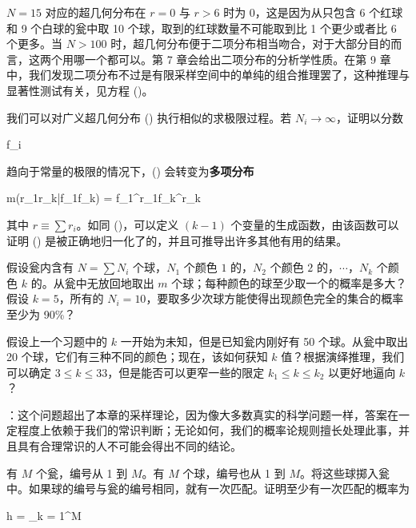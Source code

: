
\indentation $N = 15$ 对应的超几何分布在 $r = 0$ 与 $r > 6$ 时为 $0$，这是因为从只包含 6 个红球和 9 个白球的瓮中取 10 个球，取到的红球数量不可能取到比 1 个更少或者比 6 个更多。当 $N > 100$ 时，超几何分布便于二项分布相当吻合，对于大部分目的而言，这两个用哪一个都可以。第 7 章会给出二项分布的分析学性质。在第 9 章中，我们发现二项分布不过是有限采样空间中的单纯的组合推理罢了，这种推理与显著性测试有关，见方程 (\in[9-46])。

我们可以对广义超几何分布 (\in[3-75]) 执行相似的求极限过程。若 $N_i\rightarrow\infty$，证明以分数

\placeformula[3-88]
\startformula
f_i \equiv {}
\stopformula

趋向于常量的极限的情况下，(\in[3-75]) 会转变为{\bf 多项分布}

\placeformula[3-89]
\startformula
m(r_1\cdots r_k|f_1\cdots f_k) = f_1^{r_1}\cdots f_k^{r_k}
\stopformula

其中 $r \equiv \sum r_i$。如同 (\in[3-87])，可以定义 $(k - 1)$ 个变量的生成函数，由该函数可以证明 (\in[3-89]) 是被正确地归一化了的，并且可推导出许多其他有用的结果。

\startExercise
假设瓮内含有 $N = \sum N_i$ 个球，$N_1$ 个颜色 $1$ 的，$N_2$ 个颜色 $2$ 的，$\cdots$，$N_k$ 个颜色 $k$ 的。从瓮中无放回地取出 $m$ 个球；每种颜色的球至少取一个的概率是多大？假设 $k = 5$，所有的 $N_i = 10$，要取多少次球方能使得出现颜色完全的集合的概率至少为 90\%？
\stopExercise

\startExercise
假设上一个习题中的 $k$ 一开始为未知，但是已知瓮内刚好有 50 个球。从瓮中取出 20 个球，它们有三种不同的颜色；现在，该如何获知 $k$ 值？根据演绎推理，我们可以确定 $3 \le k \le 33$，但是能否可以更窄一些的限定 $k_1\le k \le k_2$ 以更好地逼向 $k$？

：这个问题超出了本章的采样理论，因为像大多数真实的科学问题一样，答案在一定程度上依赖于我们的常识判断；无论如何，我们的概率论规则擅长处理此事，并且具有合理常识的人不可能会得出不同的结论。
\stopExercise

\startExercise
有 $M$ 个瓮，编号从 1 到 $M$。有 $M$ 个球，编号也从 1 到 $M$。将这些球掷入瓮中。如果球的编号与瓮的编号相同，就有一次匹配。证明至少有一次匹配的概率为

\placeformula[3-90]
\startformula
h = \sum_{k = 1}^M 
\stopformula

